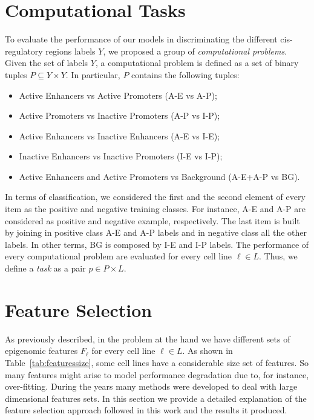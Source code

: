 \section{Computational Tasks} \label{sec:computational_tasks}
To evaluate the performance of our models in discriminating the different cis-regulatory regions labels $Y$, we proposed a group of \emph{computational problems}. Given the set of labels $Y$, a computational problem is defined as a set of binary tuples $P \subseteq Y \times Y$. In particular, $P$ contains the following tuples: 
\begin{itemize}
    \item Active Enhancers vs Active Promoters (A-E vs A-P);
    \item Active Promoters vs Inactive Promoters (A-P vs I-P);
    \item Active Enhancers vs Inactive Enhancers (A-E vs I-E); 
    \item Inactive Enhancers vs Inactive Promoters (I-E vs I-P); 
    \item Active Enhancers and Active Promoters vs Background (A-E+A-P vs BG).
\end{itemize}
In terms of classification, we considered the first and the second element of every item as the positive and negative training classes. For instance, A-E and A-P are considered as positive and negative example, respectively. The last item is built by joining in positive class A-E and A-P labels and in negative class all the other labels. In other terms, BG is composed by I-E and I-P labels. The performance of every computational problem are evaluated for every cell line $\ell \in L$. Thus, we define a \emph{task} as a pair $p \in P \times L$. 

\section{Feature Selection} \label{sec:featureselection}
As previously described, in the problem at the hand we have different sets of epigenomic features $F_\ell$ for every cell line $\ell \in L$. As shown in Table~\ref{tab:featuressize}, some cell lines have a considerable size set of features. So many features might arise to model performance degradation due to, for instance, over-fitting. During the years many methods were developed to deal with large dimensional features sets. In this section we provide a detailed explanation of the feature selection approach followed in this work and the results it produced. 

